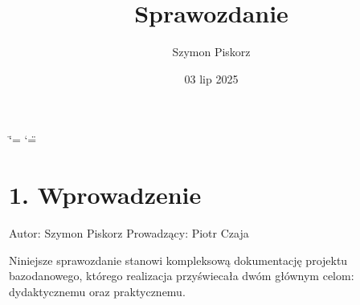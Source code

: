 \documentclass[letterpaper,10pt,polish]{sphinxmanual}
\title{Sprawozdanie}
\date{03 lip 2025}
\author{Szymon Piskorz}
\begin{document}
\ifdefined\shorthandoff
  \ifnum\catcode`\=\string=\active\shorthandoff{=}\fi
  \ifnum\catcode`\"=\active{}\fi
\fi

\pagestyle{empty}
\sphinxmaketitle
\pagestyle{plain}
\sphinxtableofcontents
\pagestyle{normal}
\label{\detokenize{index::doc}}


\sphinxstepscope


\chapter{1. Wprowadzenie}
\label{\detokenize{rozdzial1/rozdzial1:wprowadzenie}}\label{\detokenize{rozdzial1/rozdzial1::doc}}
\sphinxAtStartPar
Autor: Szymon Piskorz
Prowadzący: Piotr Czaja

\sphinxAtStartPar
Niniejsze sprawozdanie stanowi kompleksową dokumentację projektu bazodanowego, którego realizacja przyświecała dwóm głównym celom: dydaktycznemu oraz praktycznemu.
\end{document}
